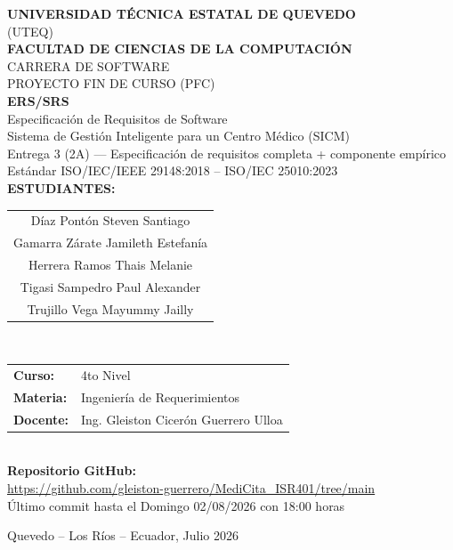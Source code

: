 \documentclass[11pt,a4paper]{article}
\begin{document}
	
	\begin{titlepage}
		\centering
		\vspace*{0.5cm}
		
		{\LARGE\bfseries\color{black} UNIVERSIDAD TÉCNICA ESTATAL DE QUEVEDO}\\[0.5cm]
		{\large (UTEQ)}\\[1.2cm]
		
		{\Large\bfseries FACULTAD DE CIENCIAS DE LA COMPUTACIÓN}\\[0.3cm]
		{\large CARRERA DE SOFTWARE}\\[0.3cm]
		{\large PROYECTO FIN DE CURSO (PFC)}\\[1.5cm]
		
		{\LARGE\bfseries ERS/SRS}\\[0.3cm]
		{\Large Especificación de Requisitos de Software}\\[0.3cm]
		{\Large Sistema de Gestión Inteligente para un Centro Médico (SICM)}\\[0.5cm]
		
		
		{\large Entrega 3 (2A) --- Especificación de requisitos completa + componente empírico}\\[0.2cm]
		{\normalsize Estándar ISO/IEC/IEEE 29148:2018 -- ISO/IEC 25010:2023}\\[1.5cm]
		
		{\large\bfseries ESTUDIANTES:}\\[0.3cm]
		\begin{tabular}{c}
			Díaz Pontón Steven Santiago \\
			Gamarra Zárate Jamileth Estefanía \\
			Herrera Ramos Thais Melanie \\
			Tigasi Sampedro Paul Alexander \\
			Trujillo Vega Mayummy Jailly
		\end{tabular}\\[1.2cm]
		
		\begin{tabular}{ll}
			\textbf{Curso:} & 4to Nivel \\
			\textbf{Materia:} & Ingeniería de Requerimientos  \\
			\textbf{Docente:} & Ing. Gleiston Cicerón Guerrero Ulloa \\
		\end{tabular}\\[1.2cm]
		
		{\small\textbf{Repositorio GitHub:}\\
			\url{https://github.com/gleiston-guerrero/MediCita_ISR401/tree/main}}\\[1.5cm]
		
		Último commit hasta el Domingo 02/08/2026 con 18:00 horas
		
		\vfill
		{\normalsize Quevedo -- Los Ríos -- Ecuador, Julio 2026}
		
	\end{titlepage}
	
\end{document}
